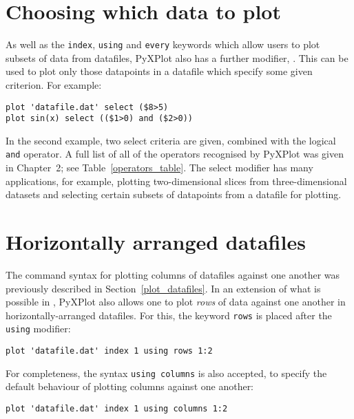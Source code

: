 \section{Choosing which data to plot}
\label{select_modifier} 
As well as the {\tt index}, {\tt using} and {\tt every} keywords which allow
users to plot subsets of data from datafiles, PyXPlot also has a further
modifier, . This can be used to plot only those datapoints in a
datafile which specify some given criterion. For example:

\begin{verbatim}
plot 'datafile.dat' select ($8>5)
plot sin(x) select (($1>0) and ($2>0))
\end{verbatim}

In the second example, two select criteria are given, combined with the logical
{\tt and} operator. A full list of all of the operators recognised by PyXPlot
was given in Chapter~2; see Table~\ref{operators_table}.  The select modifier
has many applications, for example, plotting two-dimensional slices from
three-dimensional datasets and selecting certain subsets of datapoints from a
datafile for plotting.

\section{Horizontally arranged datafiles}

\label{horizontal_datafiles} The command syntax for plotting
columns of datafiles against one another was previously described in
Section~\ref{plot_datafiles}.  In an extension of what is possible in \gnuplot,
PyXPlot also allows one to plot {\it rows} of data against one another in
horizontally-arranged datafiles.  For this, the keyword {\tt rows} is placed
after the {\tt using} modifier:

\begin{verbatim}
plot 'datafile.dat' index 1 using rows 1:2
\end{verbatim}

\noindent For completeness, the syntax {\tt using columns} is also
accepted, to specify the default behaviour of plotting columns against one
another:

\begin{verbatim}
plot 'datafile.dat' index 1 using columns 1:2
\end{verbatim}

